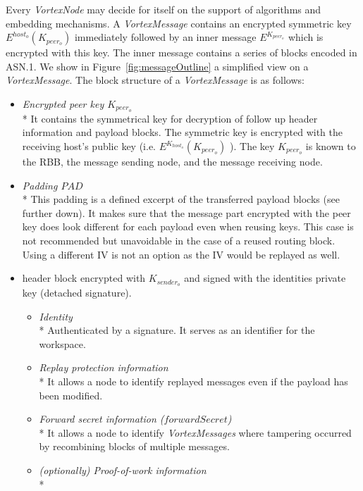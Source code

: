 \documentclass[acmsmall, screen]{acmart}
\begin{document}

Every \emph{VortexNode} may decide for itself on the support of algorithms and embedding mechanisms. A \emph{VortexMessage} contains an encrypted symmetric key $E^{host_o}\left(K_{peer_o}\right)$ immediately followed by an inner message $E^{K_{peer_o}}$ which is encrypted with this key. The inner message contains a series of blocks encoded in ASN.1. We show in Figure~\ref{fig:messageOutline} a simplified view on a \emph{VortexMessage}. The block structure of a \emph{VortexMessage} is as follows:
\begin{itemize}
	\item \emph{Encrypted peer key $K_{peer_o}$}\\*
	It contains the symmetrical key for decryption of follow up header information and payload blocks. The symmetric key is encrypted with the receiving host's public key (i.e. $E^{K_{host_o}}\left(K_{peer_o}\right)$ ). The key $K_{peer_o}$ is known to the RBB, the message sending node, and the message receiving node.
	\item \emph{Padding $PAD$}\\*
	This padding is a defined excerpt of the transferred payload blocks (see further down). It makes sure that the message part encrypted with the peer key does look different for each payload even when reusing keys. This case is not recommended but unavoidable in the case of a reused routing block. Using a different IV is not an option as the IV would be replayed as well.
	\item header block encrypted with $K_{sender_o}$ and signed with the identities private key (detached signature).
	\begin{itemize}
		\item \emph{Identity}\\*
		Authenticated by a signature. It serves as an identifier for the workspace.
		\item \emph{Replay protection information}\\*
		It allows a node to identify replayed messages even if the payload has been modified.
		\item \emph{Forward secret information ($forwardSecret$)}\\*
		It allows a node to identify \emph{VortexMessages} where tampering occurred by recombining blocks of multiple messages.      
		\item \emph{(optionally) Proof-of-work information}\\*

\end{itemize}
\end{itemize}
\end{document}
